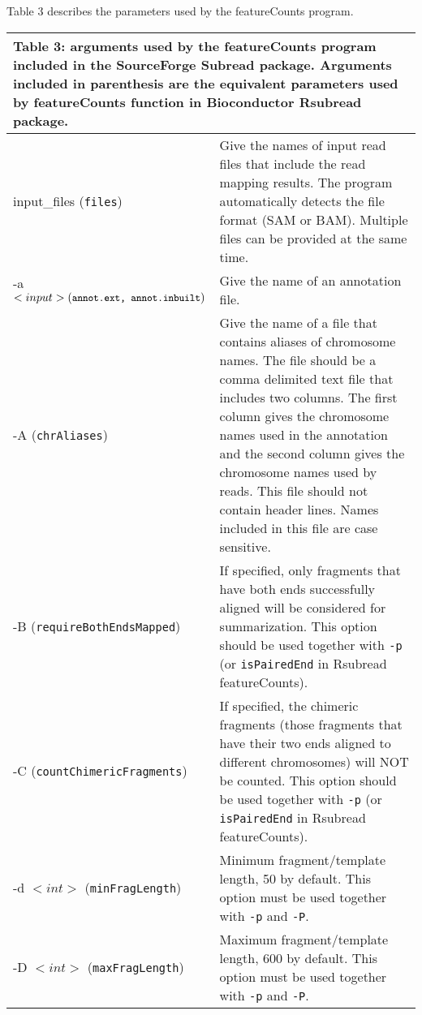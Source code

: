 \documentclass[12pt]{report}
\newcommand{\code}[1]{{\small\texttt{#1}}}
\newcommand{\Subread}{\textsf{Subread}}
\newcommand{\Rsubread}{\textsf{Rsubread}}
\newcommand{\featureCounts}{\textsf{featureCounts}}
\begin{document}
Table 3 describes the parameters used by the {\featureCounts} program.

\pagebreak

\begin{longtable}{|p{5cm}|p{11cm}|}
\multicolumn{2}{p{16cm}}{Table 3: arguments used by the {\featureCounts} program included in the SourceForge {\Subread} package.
Arguments included in parenthesis are the equivalent parameters used by {\featureCounts} function in Bioconductor {\Rsubread} package.}
\endfirsthead
\hline
Arguments & Description \\
\hline
input\_files \newline (\code{files}) & Give the names of input read files that include the read mapping results. The program automatically detects the file format (SAM or BAM). Multiple files can be provided at the same time.\\
\hline
-a $<input> \newline (\code{annot.ext, annot.inbuilt})  $ & Give the name of an annotation file. \\
\hline
-A \newline (\code{chrAliases}) & Give the name of a file that contains aliases of chromosome names. The file should be a comma delimited text file that includes two columns. The first column gives the chromosome names used in the annotation and the second column gives the chromosome names used by reads. This file should not contain header lines. Names included in this file are case sensitive.\\
\hline
-B \newline (\code{requireBothEndsMapped}) & If specified, only fragments that have both ends successfully aligned will be considered for summarization. This option should be used together with \code{-p} (or \code{isPairedEnd} in {\Rsubread} {\featureCounts}).\\
\hline
-C \newline (\code{countChimericFragments}) & If specified, the chimeric fragments (those fragments that have their two ends aligned to different chromosomes) will NOT be counted. This option should be used together with \code{-p} (or \code{isPairedEnd} in {\Rsubread} {\featureCounts}).\\
\hline
-d $<int>$ \newline (\code{minFragLength}) & Minimum fragment/template length, 50 by default. This option must be used together with \code{-p} and \code{-P}.\\
\hline
-D $<int>$ \newline (\code{maxFragLength}) & Maximum fragment/template length, 600 by default. This option must be used together with \code{-p} and \code{-P}.\\

\end{longtable}
\end{document}
